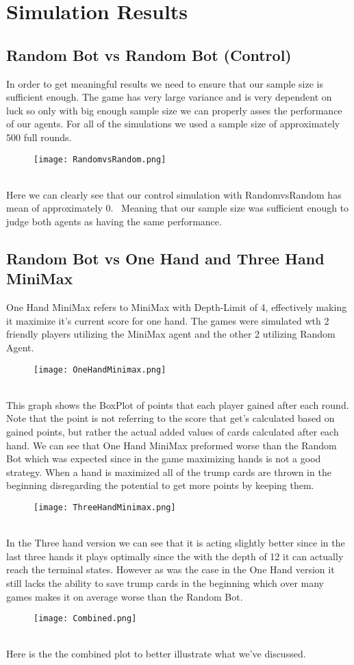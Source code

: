 \section{Simulation Results}\label{SimulationResults}
\subsection{Random Bot vs Random Bot (Control)}
In order to get meaningful results we need to ensure that our sample size is sufficient enough. 
The game has very large variance and is very dependent on luck so only with big enough sample size we can properly asses the performance of our agents.
For all of the simulations we used a sample size of approximately 500 full rounds. 
\begin{figure}[h]
    \centering
    \texttt{[image: RandomvsRandom.png]}
\end{figure}\\
Here we can clearly see that our control simulation with RandomvsRandom has mean of approximately 0. \
Meaning that our sample size was sufficient enough to judge both agents as having the same performance.

\subsection{Random Bot vs One Hand and Three Hand MiniMax}
One Hand MiniMax refers to MiniMax with Depth-Limit of 4, effectively making it maximize it's current score for one hand. 
The games were simulated wth 2 friendly players utilizing the MiniMax agent and the other 2 utilizing Random Agent.
\begin{figure}[h]
    \centering
    \texttt{[image: OneHandMinimax.png]}
\end{figure}\\
This graph shows the BoxPlot of points that each player gained after each round. 
Note that the point is not referring to the score that get's calculated based on gained points, but rather the actual added values of cards calculated after each hand.
We can see that One Hand MiniMax preformed worse than the Random Bot which was expected since in the game maximizing hands is not a good strategy. 
When a hand is maximized all of the trump cards are thrown in the beginning disregarding the potential to get more points by keeping them. 
\begin{figure}[h]
    \centering
    \texttt{[image: ThreeHandMinimax.png]}
\end{figure}\\
In the Three hand version we can see that it is acting slightly better since in the last three hands it plays optimally since the with the depth of 12 it can actually reach the terminal states.
However as was the case in the One Hand version it still lacks the ability to save trump cards in the beginning which over many games makes it on average worse than the Random Bot.
\begin{figure}[h]
    \centering
    \texttt{[image: Combined.png]}
\end{figure}\\
Here is the the combined plot to better illustrate what we've discussed.
\pagebreak
